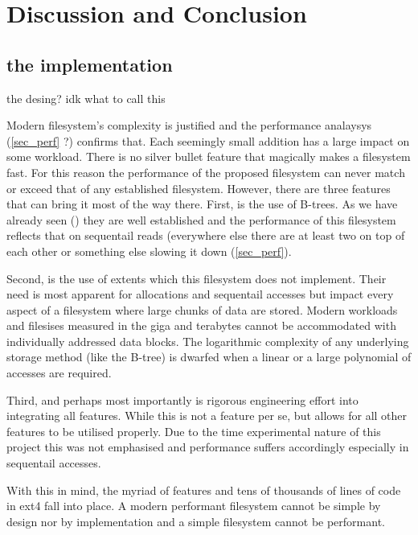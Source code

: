 \chapter{Discussion and Conclusion}

    \section{the implementation}
    the desing? idk what to call this

        Modern filesystem's complexity is justified and the performance
        analaysys (\ref{sec_perf} ?) confirms that. Each seemingly small
        addition has a large impact on some workload. There is no silver bullet
        feature that magically makes a filesystem fast. For this reason the
        performance of the proposed filesystem can never match or exceed that
        of any established filesystem. However, there are three features that
        can bring it most of the way there. First, is the use of B-trees. As we
        have already seen () they are well established and the
        performance of this filesystem reflects that on sequentail reads
        (everywhere else there are at least two on top of each other or
        something else slowing it down (\ref{sec_perf}).

        Second, is the use of extents which this filesystem does not implement.
        Their need is most apparent for allocations and sequentail accesses but
        impact every aspect of a filesystem where large chunks of data are
        stored. Modern workloads and filesises measured in the giga and
        terabytes cannot be accommodated with individually addressed data
        blocks. The logarithmic complexity of any underlying storage method
        (like the B-tree) is dwarfed when a linear or a large polynomial of
        accesses are required.

        Third, and perhaps most importantly is rigorous engineering effort into
        integrating all features. While this is not a feature per se, but
        allows for all other features to be utilised properly. Due to the time
        experimental nature of this project this was not emphasised and
        performance suffers accordingly especially in sequentail accesses.

        With this in mind, the myriad of features and tens of thousands of
        lines of code in ext4 fall into place. A modern performant filesystem
        cannot be simple by design nor by implementation and a simple
        filesystem cannot be performant.

